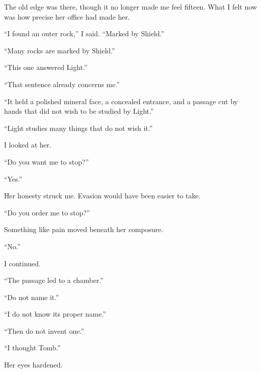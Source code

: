 The old edge was there, though it no longer made me feel fifteen. What I felt now was how precise her office had made her.\par

``I found an outer rock,'' I said. ``Marked by Shield.''\par

``Many rocks are marked by Shield.''\par

``This one answered Light.''\par

``That sentence already concerns me.''\par

``It held a polished mineral face, a concealed entrance, and a passage cut by hands that did not wish to be studied by Light.''\par

``Light studies many things that do not wish it.''\par

I looked at her.\par

``Do you want me to stop?''\par

``Yes.''\par

Her honesty struck me. Evasion would have been easier to take.\par

``Do you order me to stop?''\par

Something like pain moved beneath her composure.\par

``No.''\par

I continued.\par

``The passage led to a chamber.''\par

``Do not name it.''\par

``I do not know its proper name.''\par

``Then do not invent one.''\par

``I thought Tomb.''\par

Her eyes hardened.\par


